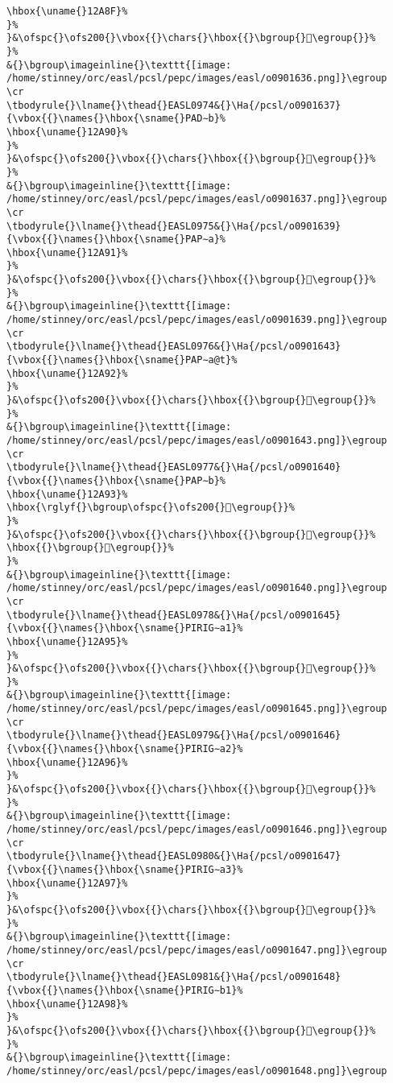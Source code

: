 \begin{verbatim}
\hbox{\uname{}12A8F}%
}%
}&\ofspc{}\ofs200{}\vbox{{}\chars{}\hbox{{}\bgroup{}𒪏\egroup{}}%
}%
&{}\bgroup\imageinline{}\texttt{[image: /home/stinney/orc/easl/pcsl/pepc/images/easl/o0901636.png]}\egroup
\cr
\tbodyrule{}\lname{}\thead{}EASL0974&{}\Ha{/pcsl/o0901637}{\vbox{{}\names{}\hbox{\sname{}PAD∼b}%
\hbox{\uname{}12A90}%
}%
}&\ofspc{}\ofs200{}\vbox{{}\chars{}\hbox{{}\bgroup{}𒪐\egroup{}}%
}%
&{}\bgroup\imageinline{}\texttt{[image: /home/stinney/orc/easl/pcsl/pepc/images/easl/o0901637.png]}\egroup
\cr
\tbodyrule{}\lname{}\thead{}EASL0975&{}\Ha{/pcsl/o0901639}{\vbox{{}\names{}\hbox{\sname{}PAP∼a}%
\hbox{\uname{}12A91}%
}%
}&\ofspc{}\ofs200{}\vbox{{}\chars{}\hbox{{}\bgroup{}𒪑\egroup{}}%
}%
&{}\bgroup\imageinline{}\texttt{[image: /home/stinney/orc/easl/pcsl/pepc/images/easl/o0901639.png]}\egroup
\cr
\tbodyrule{}\lname{}\thead{}EASL0976&{}\Ha{/pcsl/o0901643}{\vbox{{}\names{}\hbox{\sname{}PAP∼a@t}%
\hbox{\uname{}12A92}%
}%
}&\ofspc{}\ofs200{}\vbox{{}\chars{}\hbox{{}\bgroup{}𒪒\egroup{}}%
}%
&{}\bgroup\imageinline{}\texttt{[image: /home/stinney/orc/easl/pcsl/pepc/images/easl/o0901643.png]}\egroup
\cr
\tbodyrule{}\lname{}\thead{}EASL0977&{}\Ha{/pcsl/o0901640}{\vbox{{}\names{}\hbox{\sname{}PAP∼b}%
\hbox{\uname{}12A93}%
\hbox{\rglyf{}\bgroup\ofspc{}\ofs200{}𒪓\egroup{}}%
}%
}&\ofspc{}\ofs200{}\vbox{{}\chars{}\hbox{{}\bgroup{}𒪓\egroup{}}%
\hbox{{}\bgroup{}𒪔\egroup{}}%
}%
&{}\bgroup\imageinline{}\texttt{[image: /home/stinney/orc/easl/pcsl/pepc/images/easl/o0901640.png]}\egroup
\cr
\tbodyrule{}\lname{}\thead{}EASL0978&{}\Ha{/pcsl/o0901645}{\vbox{{}\names{}\hbox{\sname{}PIRIG∼a1}%
\hbox{\uname{}12A95}%
}%
}&\ofspc{}\ofs200{}\vbox{{}\chars{}\hbox{{}\bgroup{}𒪕\egroup{}}%
}%
&{}\bgroup\imageinline{}\texttt{[image: /home/stinney/orc/easl/pcsl/pepc/images/easl/o0901645.png]}\egroup
\cr
\tbodyrule{}\lname{}\thead{}EASL0979&{}\Ha{/pcsl/o0901646}{\vbox{{}\names{}\hbox{\sname{}PIRIG∼a2}%
\hbox{\uname{}12A96}%
}%
}&\ofspc{}\ofs200{}\vbox{{}\chars{}\hbox{{}\bgroup{}𒪖\egroup{}}%
}%
&{}\bgroup\imageinline{}\texttt{[image: /home/stinney/orc/easl/pcsl/pepc/images/easl/o0901646.png]}\egroup
\cr
\tbodyrule{}\lname{}\thead{}EASL0980&{}\Ha{/pcsl/o0901647}{\vbox{{}\names{}\hbox{\sname{}PIRIG∼a3}%
\hbox{\uname{}12A97}%
}%
}&\ofspc{}\ofs200{}\vbox{{}\chars{}\hbox{{}\bgroup{}𒪗\egroup{}}%
}%
&{}\bgroup\imageinline{}\texttt{[image: /home/stinney/orc/easl/pcsl/pepc/images/easl/o0901647.png]}\egroup
\cr
\tbodyrule{}\lname{}\thead{}EASL0981&{}\Ha{/pcsl/o0901648}{\vbox{{}\names{}\hbox{\sname{}PIRIG∼b1}%
\hbox{\uname{}12A98}%
}%
}&\ofspc{}\ofs200{}\vbox{{}\chars{}\hbox{{}\bgroup{}𒪘\egroup{}}%
}%
&{}\bgroup\imageinline{}\texttt{[image: /home/stinney/orc/easl/pcsl/pepc/images/easl/o0901648.png]}\egroup

\end{verbatim}
